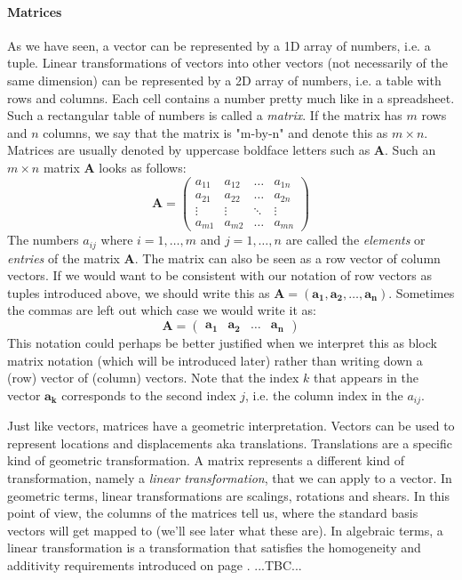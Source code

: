 \paragraph{Matrices}
As we have seen, a vector can be represented by a 1D array of numbers, i.e. a tuple. Linear transformations of vectors into other vectors (not necessarily of the same dimension) can be represented by a 2D array of numbers, i.e. a table with rows and columns. Each cell contains a number pretty much like in a spreadsheet. Such a rectangular table of numbers is called a \emph{matrix}. If the matrix has $m$ rows and $n$ columns, we say that the matrix is "m-by-n" and denote this as $m \times n$. Matrices are usually denoted by uppercase boldface letters such as $\mathbf{A}$. Such an $m \times n$ matrix $\mathbf{A}$ looks as follows:
\begin{equation}
\mathbf{A} =
\begin{pmatrix} 
  a_{11} & a_{12} & \dots  & a_{1n} \\
  a_{21} & a_{22} & \dots  & a_{2n} \\
  \vdots & \vdots & \ddots & \vdots \\
  a_{m1} & a_{m2} & \dots  & a_{mn} 
\end{pmatrix} 
\end{equation}
The numbers $a_{ij}$ where $i = 1, \ldots, m$ and $j = 1, \ldots, n$ are called the \emph{elements} or \emph{entries} of the matrix $\mathbf{A}$. The matrix can also be seen as a row vector of column vectors. If we would want to be consistent with our notation of row vectors as tuples introduced above, we should write this as $\mathbf{A} = (\mathbf{a_1}, \mathbf{a_2}, \dots, \mathbf{a_n})$. Sometimes the commas are left out which case we would write it as:
\begin{equation}
\mathbf{A} = 
\begin{pmatrix} 
 \mathbf{a_1} & \mathbf{a_2} & \dots & \mathbf{a_n}
\end{pmatrix} 
\end{equation}
This notation could perhaps be better justified when we interpret this as block matrix notation (which will be introduced later) rather than writing down a (row) vector of (column) vectors. Note that the index $k$ that appears in the vector $\mathbf{a_k}$ corresponds to the second index $j$, i.e. the column index in the $a_{ij}$.

\medskip
Just like vectors, matrices have a geometric interpretation. Vectors can be used to represent locations and displacements aka translations. Translations are a specific kind of geometric transformation. A matrix represents a different kind of transformation, namely a \emph{linear transformation}, that we can apply to a vector. In geometric terms, linear transformations are scalings, rotations and shears. In this point of view, the columns of the matrices tell us, where the standard basis vectors will get mapped to (we'll see later what these are). In algebraic terms, a linear transformation is a transformation that satisfies the homogeneity and additivity requirements introduced on page \pageref{Def:Linearity}.
...TBC...



